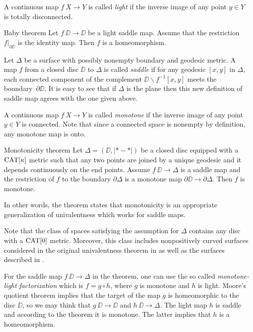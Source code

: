 \documentclass{article}
\begin{document}
A continuous map $f\:X\to Y$ is called \emph{light} if the inverse image of any point $y\in Y$ is totally disconnected.

\begin{thm}{Baby theorem}\label{baby}
Let $f\:\DD\to \DD$ be a light saddle map.
Assume that 
the restriction $f|_{\partial\DD}$ is the identity map.
Then $f$ is a homeomorphism.
\end{thm}

Let $\Delta$ be a surface with possibly nonempty boundary and geodesic metric.
A map $f$ from a closed disc $\DD$ to $\Delta$ is called \emph{saddle} 
if for any geodesic $[x,y]$ in $\Delta$, each connected component of the complement $\DD\backslash f^{-1}[x,y]$ meets the boundary~$\partial\DD$.
It is easy to see that if $\Delta$ is the plane then this new definition of saddle map agrees with the one given above.

A continuous map $f\:X\to Y$ is called \emph{monotone} if the inverse image of any point $y\in Y$ is connected.
Note that since a connected space is nonempty by definition, any monotone map is onto.

\begin{thm}{Monotonicity theorem}\label{thm:main}
Let $\Delta=(\DD,|{*}-{*}|)$ be a closed disc equipped with a $\mathop{\rm CAT}\nolimits[\kappa]$ metric 
such that any two points are joined by a unique geodesic and it depends continuously on the end points.
Assume $f\:\DD\to \Delta$ is a saddle map and the restriction of $f$ to the boundary $\partial\Delta$ is a monotone map 
$\partial\DD\to\partial\Delta$.
Then $f$ is monotone. 
\end{thm}

In other words, the theorem states that monotonicity is an appropriate generalization of univalentness which works for saddle maps.

Note that the class of spaces satisfying the assumption for $\Delta$ contains any disc with a $\mathop{\rm CAT}\nolimits[0]$ metric.
Moreover, this class includes nonpositively curved surfaces considered in the original univalentness theorem in \cite{schoen-yau}
as well as the surfaces described in \cite{jost}.

For the saddle map $f\:\DD\to \Delta$ in the theorem,
one can use the so called \emph{monotone-light factorization} \cite{eilenberg}
which is $f=g\circ h$,
where $g$ is monotone and $h$ is light.
Moore's quotient theorem \cite{moore} implies that the target of the map $g$ is homeomorphic to the disc $\DD$, so we may think that $g\:\DD\to \DD$ and $h\:\DD\to \Delta$.
The light map $h$ is saddle and according to the theorem it is monotone.
The latter implies that $h$ is a homeomorphism.
\end{document}
